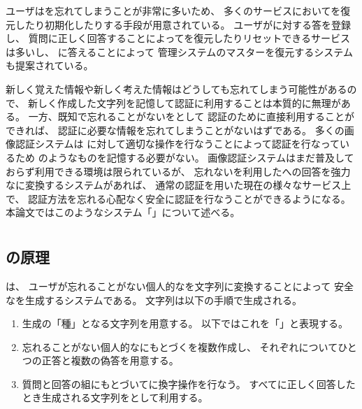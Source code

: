 \documentclass[twoside]{wiss}
\begin{document}
ユーザは{\PW}を忘れてしまうことが非常に多いため、
多くのサービスにおいて{\PW}を復元したり初期化したりする手段が用意されている。
ユーザが{\SQ}に対する答を登録し、
質問に正しく回答することによって{\PW}を復元したりリセットできるサービスは多いし、
{\SQ}に答えることによって
{\PW}管理システムのマスター{\PW}を復元するシステム\cite{平野亮:2011-11-07}も提案されている。

新しく覚えた情報や新しく考えた情報はどうしても忘れてしまう可能性があるので、
新しく作成した{\PW}文字列を記憶して認証に利用することは本質的に無理がある。
一方、既知で忘れることがない{\EM}を{\SQ}として
認証のために直接利用することができれば、
認証に必要な情報を忘れてしまうことがないはずである。
多くの画像認証システム\cite{小池英樹:2006-05-15}\cite{GraphicalPasswords}は
{\SQ}に対して適切な操作を行なうことによって認証を行なっているため
{\PW}のようなものを記憶する必要がない。
%
画像認証システムはまだ普及しておらず利用できる環境は限られているが、
忘れない{\EM}を利用した{\SQ}への回答を強力な{\PW}に変換するシステムがあれば、
通常の{\PW}認証を用いた現在の様々なサービス上で、
認証方法を忘れる心配なく安全に認証を行なうことができるようになる。
本論文ではこのようなシステム「{\EP}」について述べる。

\section{{\EP}}

\subsection{{\EP}の原理}

{\EP}は、
ユーザが忘れることがない個人的な{\EM}を文字列に変換することによって
安全な{\PW}を生成するシステムである。
{\PW}文字列は以下の手順で生成される。

\begin{enumerate}
\item {\PW}生成の「種」となる文字列を用意する。
以下ではこれを「{\SS}」と表現する。
\item 忘れることがない個人的な{\EM}にもとづく{\SQ}を複数作成し、
それぞれについてひとつの正答と複数の偽答を用意する。
\item 質問と回答の組にもとづいて{\SS}に換字操作を行なう。
すべてに正しく回答したとき生成される文字列を{\PW}として利用する。
\end{enumerate}
\end{document}
